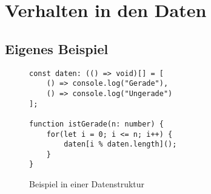 \section{Verhalten in den Daten}
\subsection{Eigenes Beispiel}
\begin{figure}[ht]
    \centering
        \begin{verbatim}
const daten: (() => void)[] = [
    () => console.log("Gerade"),
    () => console.log("Ungerade")
];

function istGerade(n: number) {
    for(let i = 0; i <= n; i++) {
        daten[i % daten.length]();
    }
}
        \end{verbatim}
    \caption{Beispiel in einer Datenstruktur}
    \label{fig:KontrollflussIstGerade}
\end{figure}